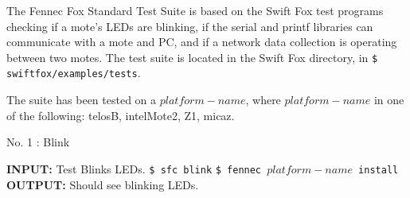 \documentclass[11pt]{article}
\begin{document}
\vfill





The Fennec Fox Standard Test Suite is based on the Swift Fox test programs
checking if a mote's LEDs are blinking, if the serial and printf libraries
can communicate with a mote and PC, and if a network data collection is 
operating between two motes. The test suite is located in the Swift Fox
directory, in \texttt{\$ swiftfox/examples/tests}.

The suite has been tested on a $platform-name$, where
$platform-name$ in one of the following: telosB, intelMote2, Z1, micaz.

\newpage

\begin{center}
{\large No. 1 : Blink} 	
\end{center}
\vspace{1cm}
	\textbf{INPUT:}\newline
	Test Blinks LEDs. \newline
	\texttt{\$ sfc blink} \newline
	\texttt{\$ fennec $platform-name$ install}\newline
	\textbf{OUTPUT:}\newline
	Should see blinking LEDs. 

\vspace{1cm}
\newpage
\end{document}
